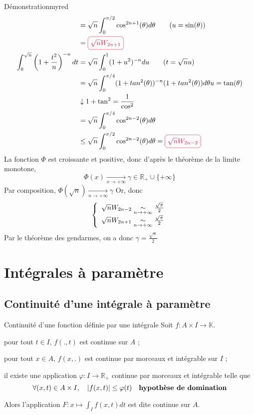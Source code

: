 \begin{demo}{Démonstration}{myred}
\begin{align*}
            &= \sqrt{n} \int_{0}^{\pi / 2} \cos^{2n+1}(\theta) d\theta  \qquad (u = \sin(\theta)) \\
            &= \lilbox{myred}{$\sqrt{n} W_{2n+1}$} \\
            \int_{0}^{\sqrt{n}} \left(1 + \frac{t^2}{n}\right)^{-n} dt &= \sqrt{n} \int_{0}^{1} (1 + u^2)^{-n} du \qquad (t = \sqrt{n} u) \\
            &= \sqrt{n} \int_{0}^{\pi / 4} (1 + tan^2(\theta))^{-n} (1 + tan^2(\theta)) d\theta \hfill u = \tan(\theta) \\
            &\downarrow 1 + \tan^2 = \frac{1}{\cos^2} \\
            & = \sqrt{n} \int_{0}^{\pi / 4} \cos^{2n-2}(\theta)d\theta \\
            &\leq \sqrt{n} \int_{0}^{\pi / 2} \cos^{2n-2}(\theta)d\theta = \lilbox{myred}{$\sqrt{n}W_{2n-2}$}
        \end{align*}
        La fonction $\Phi$ est croissante et positive, donc d’après le théorème de la limite monotone, \[ \Phi(x) \underset{x \rightarrow + \infty}{\longrightarrow} \gamma \in \mathbb{R}_+ \cup \{ + \infty \} \] 
        Par composition, $\Phi (\sqrt{n}) \underset{n \rightarrow + \infty}{\longrightarrow} \gamma$
        \newline
        Or,  donc \[ \et{\sqrt{n} W_{2n-2} \underset{n \rightarrow + \infty}{\sim} \frac{\sqrt{\pi}}{2}}{\sqrt{n} W_{2n+1} \underset{n \rightarrow + \infty}{\sim} \frac{\sqrt{\pi}}{2}} \] 
        Par le théorème des gendarmes, on a donc $\gamma = \frac{\sqrt{\pi}}{2}$
    \end{demo}

\newpage

\section{Intégrales à paramètre}

\subsection{Continuité d’une intégrale à paramètre}

    \begin{theo}{Continuité d’une fonction définie par une intégrale}{}
        Soit $f : A \times I \to \mathbb{K}$. 
        \begin{suppose}
            \item pour tout $t \in I$, $f(.,t)$ est continue sur $A$ ;
            \item pour tout $x \in A$, $f(x,.)$ est continue par morceaux et intégrable sur $I$ ;
            \item il existe une application $\varphi : I \to \mathbb{R}_+$ continue par morceaux et intégrable telle que 
            \[ \forall (x,t) \in A \times I, \quad \left\lvert f(x,t)\right\rvert \leq \varphi(t) \quad \textbf{hypothèse de domination} \]
        \end{suppose}
        Alors l’application $F : x \longmapsto \int_I f(x,t) dt$ est dite continue sur $A$.
    \end{theo}

